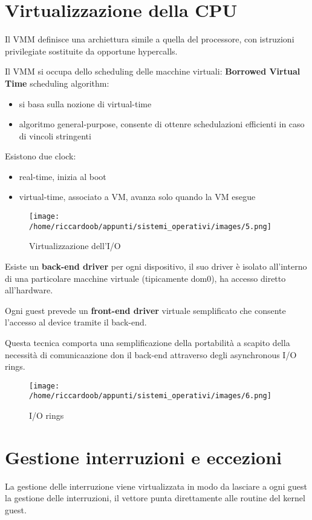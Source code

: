 \section{Virtualizzazione della CPU}
Il VMM definisce una archiettura simile a quella del processore, con istruzioni privilegiate sostituite da opportune hypercalls.

Il VMM si occupa dello scheduling delle macchine virtuali: \textbf{Borrowed Virtual Time} scheduling algorithm:
\begin{itemize}
	\item si basa sulla nozione di virtual-time
	\item algoritmo general-purpose, consente di ottenre schedulazioni efficienti in caso di vincoli stringenti
\end{itemize}

Esistono due clock:
\begin{itemize}
	\item real-time, inizia al boot
	\item virtual-time, associato a VM, avanza solo quando la VM esegue
\end{itemize}

\begin{figure}[H]
	\caption{Virtualizzazione dell'I/O}
	\centering
	\texttt{[image: /home/riccardoob/appunti/sistemi\_operativi/images/5.png]}
\end{figure}

Esiste un \textbf{back-end driver} per ogni dispositivo, il suo driver è isolato all'interno di una particolare macchine virtuale (tipicamente dom0), ha accesso diretto all'hardware.

Ogni guest prevede un \textbf{front-end driver} virtuale semplificato che consente l'accesso al device tramite il back-end.

Questa tecnica comporta una semplificazione della portabilità a scapito della necessità di comunicaazione don il back-end attraverso degli asynchronous I/O rings.
\begin{figure}[H]
	\caption{I/O rings}
	\centering
	\texttt{[image: /home/riccardoob/appunti/sistemi\_operativi/images/6.png]}
\end{figure}

\section{Gestione interruzioni e eccezioni}
La gestione delle interruzione viene virtualizzata in modo da lasciare a ogni guest la gestione delle interruzioni, il vettore punta direttamente alle routine del kernel guest.

